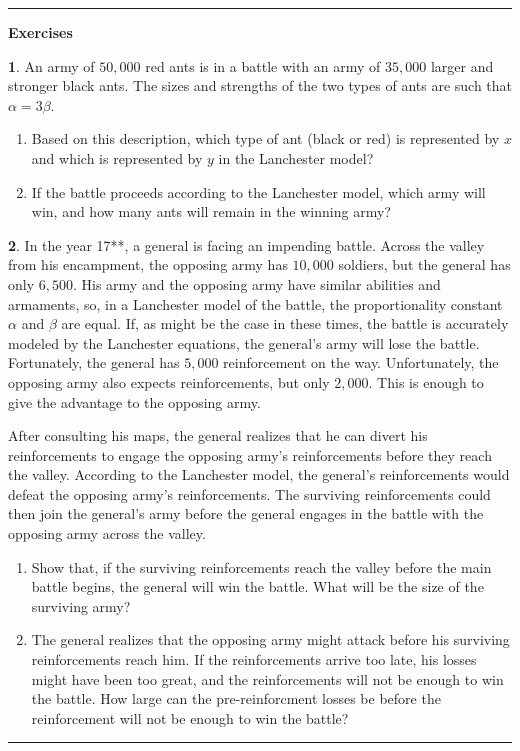 \documentclass[reqno]{immbook}
\numberwithin{equation}{chapter}
\numberwithin{question}{section}
\numberwithin{theorem}{chapter}
\numberwithin{figure}{chapter}
\theoremstyle{definition}
\newtheorem{exercise}{}[section]
\newenvironment{exercises}%
{%
\medskip\hrule\medskip\noindent\textbf{Exercises}%
}%
{%
\medskip\hrule
}
\begin{document}
\medskip
\begin{exercises}
\begin{exercise}
An army of $50,000$ red ants is in a battle
with an army of $35,000$ larger and stronger black ants.
The sizes and strengths of the two types of ants
are such that $\alpha=3\beta$.
\begin{enumerate}
\item Based on this description, which type of ant
(black or red) is represented by $x$
and which is represented by $y$ in the
Lanchester model?
\item If the battle proceeds according to the Lanchester
model, which army will win, and how many ants will
remain in the winning army?
\end{enumerate}
\end{exercise}
\begin{exercise}
In the year 17**, a general is facing an impending battle.
Across the valley from his encampment, the opposing
army has $10,000$ soldiers, but the general has only $6,500$.
His army and the opposing army have similar abilities
and armaments, so, in a Lanchester model of the battle,
the proportionality constant $\alpha$ and $\beta$
are equal.
If, as might be the case in these times, the battle
is accurately modeled by the Lanchester equations,
the general's army will lose the battle.
Fortunately, the general has $5,000$ reinforcement
on the way.  Unfortunately, the opposing army
also expects reinforcements, but only $2,000$.
This is enough to give the advantage to the opposing
army.

After consulting his maps, the general realizes that
he can divert his reinforcements to engage the
opposing army's reinforcements before they
reach the valley. According to the Lanchester model,
the general's reinforcements would defeat
the opposing army's reinforcements.  The surviving
reinforcements could then join the general's army
before the general engages in the battle with the
opposing army across the valley.

\begin{enumerate}
\item Show that, if the surviving reinforcements reach the valley
before the main battle begins, the general will win
the battle.
What will be the size of the surviving army?
\item The general realizes that the opposing army
might attack before his surviving reinforcements
reach him. If the reinforcements arrive too late,
his losses might have been too great, and the
reinforcements will not be enough to win the battle.
How large can the pre-reinforcment losses be before
the reinforcement will not be enough to win the battle?
\end{enumerate}
\end{exercise}
\end{exercises}
\end{document}
